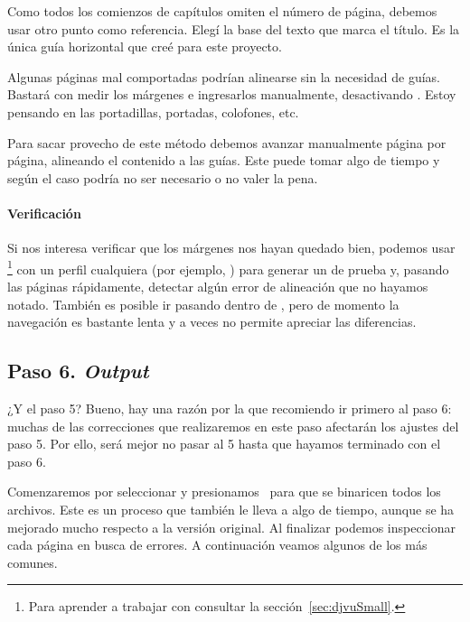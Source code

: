 \documentclass[%
	a5paper,
	10pt,
	twoside,
	openright,
	final,
]{memoir}
\begin{document}
	Como todos los comienzos de capítulos omiten el número de página, debemos usar otro punto como referencia. Elegí la base del texto que marca el título. Es la única guía horizontal que creé para este proyecto.

	Algunas páginas mal comportadas podrían alinearse sin la necesidad de guías. Bastará con medir los márgenes e ingresarlos manualmente, desactivando . Estoy pensando en las portadillas, portadas, colofones, etc.

	Para sacar provecho de este método debemos avanzar manualmente página por página, alineando el contenido a las guías. Este puede tomar algo de tiempo y según el caso podría no ser necesario o no valer la pena.

	\paragraph{Verificación} Si nos interesa verificar que los márgenes nos hayan quedado bien, podemos usar \djvusmall\footnote{Para aprender a trabajar con \djvusmall consultar la sección~\ref{sec:djvuSmall}.} con un perfil cualquiera (por ejemplo, ) para generar un \djvu de prueba y, pasando las páginas rápidamente, detectar algún error de alineación que no hayamos notado. También es posible ir pasando dentro de \scantailor, pero de momento la navegación es bastante lenta y a veces no permite apreciar las diferencias.

	\subsection{Paso 6. \emph{Output}\label{sec:SToutput}} ¿Y el paso 5? Bueno, hay una razón por la que recomiendo ir primero al paso 6: muchas de las correcciones que realizaremos en este paso afectarán los ajustes del paso 5. Por ello, será mejor no pasar al 5 hasta que hayamos terminado con el paso 6.

	Comenzaremos por seleccionar  y presionamos \play\ para que se binaricen todos los archivos. Este es un proceso que también le lleva a \scantailorAdvanced algo de tiempo, aunque se ha mejorado mucho respecto a la versión original. Al finalizar podemos inspeccionar cada página en busca de errores. A continuación veamos algunos de los más comunes.
\end{document}
